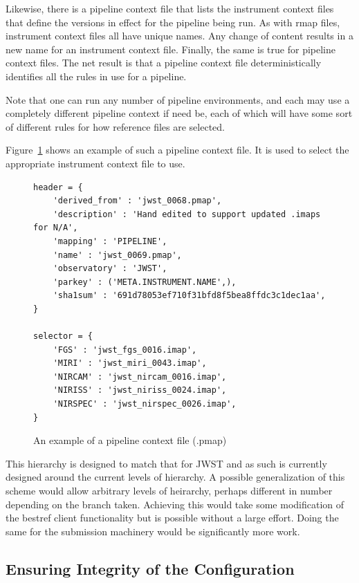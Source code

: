 \documentclass[final,authoryear,5p,times,twocolumn]{elsarticle}
\begin{document}
Likewise, there is a pipeline context file that lists the instrument context
files that define the versions in effect for the pipeline being run. As with
rmap files, instrument context files all have unique names. Any change of
content results in a new name for an instrument context file. Finally, the same
is true for pipeline context files. The net result is that a pipeline context
file deterministically identifies all the rules in use for a pipeline. 

Note that one can run any number of pipeline environments, and each may use a
completely different pipeline context if need be, each of which will have some
sort of different rules for how reference files are selected.

Figure~\ref{fig:example_pipeline_context} shows an example of such a pipeline context file.
It is used to select the appropriate instrument context file to use.

\begin{figure}
\begin{verbatim}
header = {
    'derived_from' : 'jwst_0068.pmap',
    'description' : 'Hand edited to support updated .imaps for N/A',
    'mapping' : 'PIPELINE',
    'name' : 'jwst_0069.pmap',
    'observatory' : 'JWST',
    'parkey' : ('META.INSTRUMENT.NAME',),
    'sha1sum' : '691d78053ef710f31bfd8f5bea8ffdc3c1dec1aa',
}

selector = {
    'FGS' : 'jwst_fgs_0016.imap',
    'MIRI' : 'jwst_miri_0043.imap',
    'NIRCAM' : 'jwst_nircam_0016.imap',
    'NIRISS' : 'jwst_niriss_0024.imap',
    'NIRSPEC' : 'jwst_nirspec_0026.imap',
}
\end{verbatim}
\caption{An example of a pipeline context file (.pmap)}
\label{fig:example_pipeline_context}
\end{figure}


This hierarchy is designed to match that for JWST and as such is currently
designed around the current levels of hierarchy. A possible generalization
of this scheme would allow arbitrary levels of heirarchy, perhaps
different in number depending on the branch taken. Achieving this would
take some modification of the bestref client functionality but is possible
without a large effort. Doing the same for the submission machinery would 
be significantly more work. 

\subsection{Ensuring Integrity of the Configuration}
\end{document}
